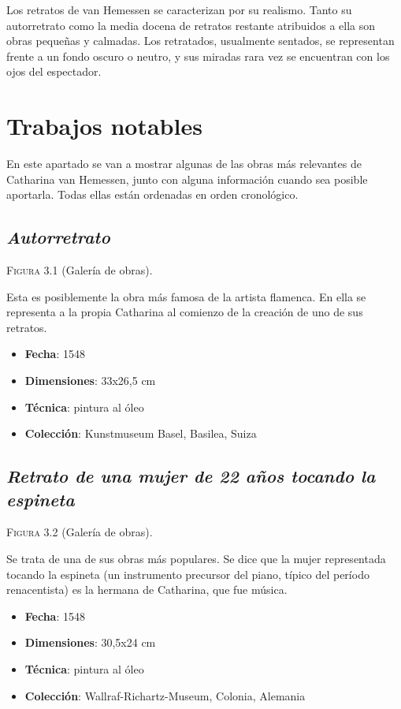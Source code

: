 \documentclass[12pt]{report}
\begin{document}
Los retratos de van Hemessen se caracterizan por su realismo. Tanto su autorretrato como la media docena de retratos restante atribuidos a ella son obras pequeñas y calmadas. Los retratados, usualmente sentados, se representan frente a un fondo oscuro o neutro, y sus miradas rara vez se encuentran con los ojos del espectador.\bigskip

\chapter{Trabajos notables}

En este apartado se van a mostrar algunas de las obras más relevantes de Catharina van Hemessen, junto con alguna información cuando sea posible aportarla. Todas ellas están ordenadas en orden cronológico.

\section{\textit{Autorretrato}}

\textsc{Figura 3.1} (Galería de obras).\bigskip

Esta es posiblemente la obra más famosa de la artista flamenca. En ella se representa a la propia Catharina al comienzo de la creación de uno de sus retratos.
\begin{itemize}
	\item \textbf{Fecha}: 1548
	\item \textbf{Dimensiones}: 33x26,5 cm
	\item \textbf{Técnica}: pintura al óleo
	\item \textbf{Colección}: Kunstmuseum Basel, Basilea, Suiza
\end{itemize}

\section{\textit{Retrato de una mujer de 22 años tocando la espineta}}

\textsc{Figura 3.2} (Galería de obras).\bigskip

Se trata de una de sus obras más populares. Se dice que la mujer representada tocando la espineta (un instrumento precursor del piano, típico del período renacentista) es la hermana de Catharina, que fue música.
\begin{itemize}
	\item \textbf{Fecha}: 1548
	\item \textbf{Dimensiones}: 30,5x24 cm
	\item \textbf{Técnica}: pintura al óleo
	\item \textbf{Colección}: Wallraf-Richartz-Museum, Colonia, Alemania
\end{itemize}
\end{document}
